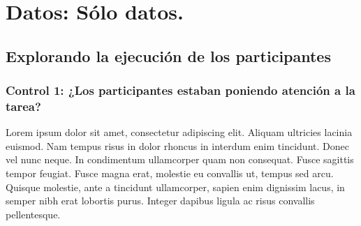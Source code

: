 
\chapter{Datos: Sólo datos.} %

\label{Cap_Data} %

\section{Explorando la ejecución de los participantes}



\subsection{Control 1: ¿Los participantes estaban poniendo atención a la tarea?}

Lorem ipsum dolor sit amet, consectetur adipiscing elit. Aliquam ultricies lacinia euismod. Nam tempus risus in dolor rhoncus in interdum enim tincidunt. Donec vel nunc neque. In condimentum ullamcorper quam non consequat. Fusce sagittis tempor feugiat. Fusce magna erat, molestie eu convallis ut, tempus sed arcu. Quisque molestie, ante a tincidunt ullamcorper, sapien enim dignissim lacus, in semper nibh erat lobortis purus. Integer dapibus ligula ac risus convallis pellentesque.


